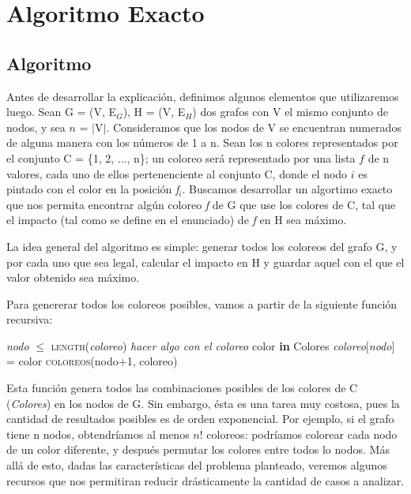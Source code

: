 \section{Algoritmo Exacto}


\subsection{Algoritmo}
Antes de desarrollar la explicaci\'on, definimos algunos elementos que utilizaremos luego.
Sean G = (V, E$_G$), H = (V, E$_H$) dos grafos con V el mismo conjunto de nodos, y sea $n$  = $|$V$|$. 
Consideramos que los nodos de V se encuentran numerados de alguna manera con los n\'umeros de 1 a n.
Sean los n colores representados por el conjunto C = \{1, 2, ..., n\}; un coloreo ser\'a representado por una lista $f$ de n valores, cada uno de ellos pertenenciente al conjunto C, donde el nodo $i$ es pintado con el color en la posici\'on \textsl{f}$_i$.
Buscamos desarrollar un algortimo exacto que nos permita encontrar alg\'un coloreo \textsl{f} de G que use los colores de C, tal que el impacto (tal como se define en el enunciado) de \textsl{f} en H sea m\'aximo. 

La idea general del algoritmo es simple: generar todos los coloreos del grafo G, y por cada uno que sea legal, calcular el impacto en H y guardar aquel con el que el valor obtenido sea m\'aximo. 

Para genererar todos los coloreos posibles, vamos a partir de la siguiente funci\'on recursiva:

\begin{algorithm}[H]
\caption{} 
\begin{codebox}
\li \If \textit{nodo} $\leq$ \textsc{length}(\textit{coloreo}) \Do
\li 		\textsl{hacer algo con el coloreo}		
		\End
\li	\Else \Do
\li			\For color \textbf{in} Colores \Do	
\li					\textit{coloreo}[\textit{nodo}] = color
\li					\textsc{coloreos}(nodo+1, coloreo)	
				\End
		\End
\End
\end{codebox}
\end{algorithm}

Esta funci\'on genera todos las combinaciones posibles de los colores de C (\textsl{Colores}) en los nodos de G.
Sin embargo, \'esta es una tarea muy costosa, pues la cantidad de resultados posibles es de orden exponencial. Por ejemplo, si el grafo tiene n nodos, obtendr\'iamos al menos $n!$ coloreos: podr\'iamos colorear cada nodo de un color diferente, y despu\'es permutar los colores entre todos lo nodos. 
M\'as all\'a de esto, dadas las caracter\'isticas del problema planteado, veremos algunos recursos que nos permitiran reducir dr\'asticamente la cantidad de casos a analizar.



